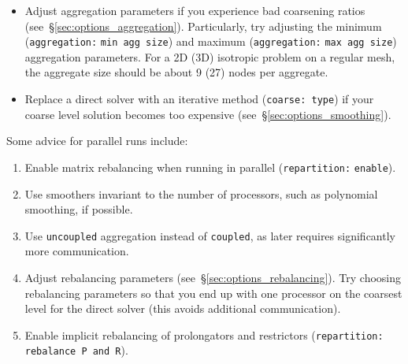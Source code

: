 \begin{itemize}
  \item
    Adjust aggregation parameters if you experience bad coarsening ratios
    (see~\S\ref{sec:options_aggregation}). Particularly, try adjusting the
    minimum (\texttt{aggregation:} \texttt{min agg size}) and maximum
    (\texttt{aggregation:} \texttt{max agg size}) aggregation parameters. For a
    2D (3D) isotropic problem on a regular mesh, the aggregate size should be
    about 9 (27) nodes per aggregate.

  \item
    Replace a direct solver with an iterative method (\texttt{coarse: type}) if
    your coarse level solution becomes too expensive (see~\S\ref{sec:options_smoothing}).
\end{itemize}

Some advice for parallel runs include:
\begin{enumerate}
  \item
    Enable matrix rebalancing when running in parallel (\texttt{repartition:}
    \texttt{enable}).

  \item
    Use smoothers invariant to the number of processors, such as
    polynomial smoothing, if possible.

  \item
    Use \texttt{uncoupled} aggregation instead of \texttt{coupled}, as later
    requires significantly more communication.

  \item
    Adjust rebalancing parameters (see~\S\ref{sec:options_rebalancing}). Try
    choosing rebalancing parameters so that you end up with one processor on the
    coarsest level for the direct solver (this avoids additional communication).

  \item
    Enable implicit rebalancing of prolongators and restrictors
    (\texttt{repartition: rebalance P and R}).
\end{enumerate}
